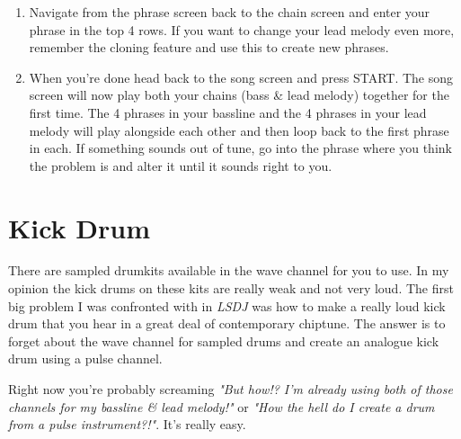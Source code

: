 \documentclass[]{article}
\newcommand{\buttonStyle}[1]{\textsf{#1}\xspace}
\newcommand{\bStart}{\buttonStyle{{START}}}
\newcommand{\lsdj}{\textit{LSDJ}\xspace}
\begin{document}
\begin{enumerate}[resume]
	
\item Navigate from the phrase screen back to the chain screen and enter your phrase in the top 4 rows. If you want to change your lead melody even more, remember the cloning feature and use this to create new phrases.

\item When you're done head back to the song screen and press \bStart. The song screen will now play both your chains (bass \& lead melody) together for the first time. The 4 phrases in your bassline and the 4 phrases in your lead melody will play alongside each other and then loop back to the first phrase in each. If something sounds out of tune, go into the phrase where you think the problem is and alter it until it sounds right to you.

\end{enumerate}

\section{Kick Drum}

There are sampled drumkits available in the wave channel for you to use. In my opinion the kick drums on these kits are really weak and not very loud. The first big problem I was confronted with in \lsdj was how to make a really loud kick drum that you hear in a great deal of contemporary chiptune.
%
The answer is to forget about the wave channel for sampled drums and create an analogue kick drum using a pulse channel.

Right now you're probably screaming \textit{"But how!? I'm already using both of those channels for my bassline \& lead melody!"} or \textit{"How the hell do I create a drum from a pulse instrument?!"}. It's really easy.
\end{document}
